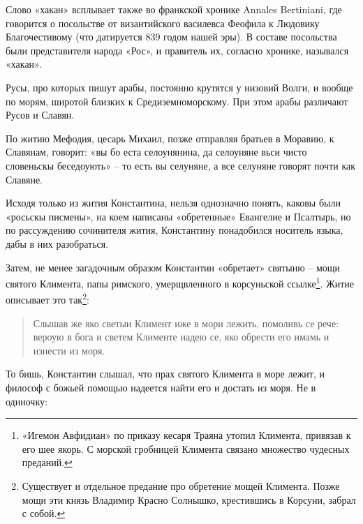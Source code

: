 \documentclass[a5paper,11pt,openany]{article}
\begin{document}
Слово «хакан» всплывает также во франкской хронике Annales Bertiniani, где говорится о посольстве от византийского василевса Феофила к Людовику Благочестивому (что датируется 839 годом нашей эры). В составе посольства были представителя народа «Рос», и правитель их, согласно хронике, назывался «хакан». 

Русы, про которых пишут арабы, постоянно крутятся у низовий Волги, и вообще по морям, широтой близких к Средиземноморскому. При этом арабы различают Русов и Славян.

По житию Мефодия, цесарь Михаил, позже отправляя братьев в Моравию, к Славянам, говорит: «вы бо еста селоунянина, да селоуняне вьси чисто словеньскы беседоують» – то есть вы селуняне, а все селуняне говорят почти как Славяне.

Исходя только из жития Константина, нельзя однозначно понять, каковы были «росьскы писмены», на коем написаны «обретенные» Евангелие и Псалтырь, но по рассуждению сочинителя жития, Константину понадобился носитель языка, дабы в них разобраться.


Затем, не менее загадочным образом Константин «обретает» святыню – мощи святого Климента, папы римского, умерщвленного в корсуньской ссылке\footnote{«Игемон Авфидиан» по приказу кесаря Траяна утопил Климента, привязав к его шее якорь. С морской гробницей Климента связано множество чудесных преданий.}. Житие описывает это так\footnote{Существует и отдельное предание про обретение мощей Климента. Позже мощи эти князь Владимир Красно Солнышко, крестившись в Корсуни, забрал с собой.}:

\begin{quotation}
Слышав же яко светыи Климент иже в мори лежить, помоливь се рече: вероую в бога и светем Клименте надею се, яко обрести его имамь и изнести из моря.
\end{quotation}

То бишь, Константин слышал, что прах святого Климента в море лежит, и философ с божьей помощью надеется найти его и достать из моря. Не в одиночку:
\end{document}
